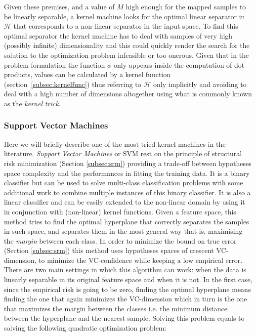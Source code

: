 Given these premises, and a value of $M$ high enough for the mapped samples to
be linearly separable, a kernel machine looks for the optimal linear separator in
$\mathcal{H}$ that corresponds to a non-linear separator in the input space.
To find this optimal separator the kernel machine has to deal with samples of
very high (possibly infinite) dimensionality and this could quickly render the
search for the solution to the optimization problem infeasible or too onerous.
Given that in the problem formulation the function $\phi$ only appears inside
the computation of dot products, values can be calculated by a kernel
function (section~\ref{subsec:kernelfunc}) thus referring to $\mathcal{H}$
only implicitly and avoiding to deal with a high number of dimensions
altogether using what is commonly known as the \emph{kernel trick}.

\subsubsection{Support Vector Machines}
\label{subsubsec:svm}
Here we will briefly describe one of the most tried kernel machines in the literature. 
\emph{Support Vector Machines} or SVM \cite{Cortes&Vapnik:1995} rest on the principle of structural risk
minimization (Section \ref{subsec:srm}) providing a trade-off between hypotheses
space complexity and the performances in fitting the training data.
It is a binary classifier but can be used to solve multi-class classification
problems with some additional work to combine multiple instances of this binary
classifier.
It is also a linear classifier and can be easily extended to the 
non-linear domain by using it in conjunction with (non-linear) kernel functions.
Given a feature space, this method tries to find the optimal hyperplane that
correctly separates the samples in such space, and separates them in the
most general way that is, maximising the \emph{margin} between each class.
In order to minimize the bound on true error (Section \ref{subsec:srm})
this method uses hypotheses spaces of crescent VC-dimension, to minimize the
VC-confidence while keeping a low empirical error.
There are two main settings in which this algorithm can work: when the data
is linearly separable in its original feature space and when it is not.
In the first case, since the empirical risk is going to be zero, finding the
optimal hyperplane means finding the one that again minimizes the VC-dimension
which in turn is the one that maximizes the margin between the classes i.e.
the minimum distance between the hyperplane and the nearest sample.
Solving this problem equals to solving the following quadratic optimization
problem:

